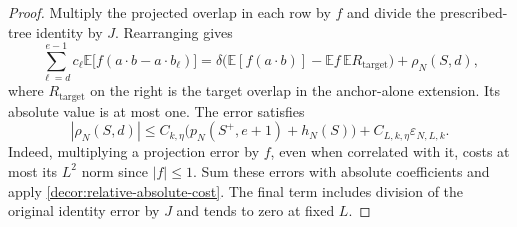 \begin{proof}
Multiply the projected overlap in each row by $f$ and divide the
prescribed-tree identity by $J$. Rearranging gives
\begin{equation}
 \sum_{\ell=d}^{e-1}c_\ell
   \mathbb E\bigl[f(a\cdot b-a\cdot b_\ell)\bigr]
 =\delta\bigl(\mathbb E[f(a\cdot b)]
          -\mathbb Ef\,\mathbb ER_{\mathrm{target}}\bigr)
       +\rho_N(S,d),
 \label{decor:induction-identity}
\end{equation}
where $R_{\mathrm{target}}$ on the right is the target overlap in
the anchor-alone extension.  Its absolute value is at most one.
The error satisfies
\begin{equation}
 |\rho_N(S,d)|\le C_{k,\eta}
       \bigl(p_N(S^+,e+1)+h_N(S)\bigr)
       +C_{L,k,\eta}\varepsilon_{N,L,k}.
 \label{decor:induction-error}
\end{equation}
Indeed, multiplying a projection error by $f$, even when correlated
with it, costs at most its $L^2$ norm since $|f|\le1$. Sum these errors
with absolute coefficients and apply
\eqref{decor:relative-absolute-cost}. The final term includes division
of the original identity error by $J$ and tends to zero at fixed $L$.


\end{proof}
